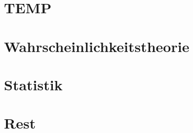 \documentclass[11pt]{article}
\begin{document}

\setcounter{tocdepth}{2}





\part{TEMP}



\part{Wahrscheinlichkeitstheorie}





\part{Statistik}







\part{Rest}

%




\end{document}
